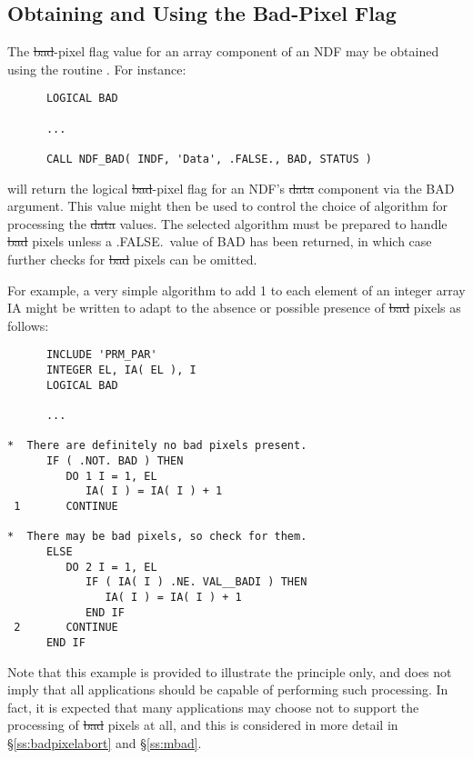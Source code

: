 \subsection{\label{ss:usingbadpixflag}Obtaining and Using the Bad-Pixel Flag}

The \st{bad\/}-pixel flag value for an array component of an NDF may be
obtained using the routine . 
For instance:

\small
\begin{verbatim}
      LOGICAL BAD

      ...

      CALL NDF_BAD( INDF, 'Data', .FALSE., BAD, STATUS )
\end{verbatim}
\normalsize

will return the logical \st{bad\/}-pixel flag for an NDF's \st{data\/} component
via the BAD argument.
This value might then be used to control the choice of algorithm for
processing the \st{data\/} values. 
The selected algorithm must be prepared to handle \st{bad\/} pixels unless a
.FALSE.\ value of BAD has been returned, in which case further checks
for \st{bad\/} pixels can be omitted.  

For example, a very simple algorithm to add 1 to each element of an integer
array IA might be written to adapt to the absence or possible presence of
\st{bad\/} pixels as follows: 

\small
\begin{verbatim}
      INCLUDE 'PRM_PAR'
      INTEGER EL, IA( EL ), I
      LOGICAL BAD

      ...

*  There are definitely no bad pixels present.
      IF ( .NOT. BAD ) THEN
         DO 1 I = 1, EL
            IA( I ) = IA( I ) + 1
 1       CONTINUE

*  There may be bad pixels, so check for them.
      ELSE
         DO 2 I = 1, EL
            IF ( IA( I ) .NE. VAL__BADI ) THEN
               IA( I ) = IA( I ) + 1
            END IF
 2       CONTINUE
      END IF
\end{verbatim}
\normalsize

Note that this example is provided to illustrate the principle only, and
does not imply that all applications should be capable of performing such 
processing.
In fact, it is expected that many applications may choose not to support the
processing of \st{bad\/} pixels at all, and this is considered in more detail
in \S\ref{ss:badpixelabort} and \S\ref{ss:mbad}. 

